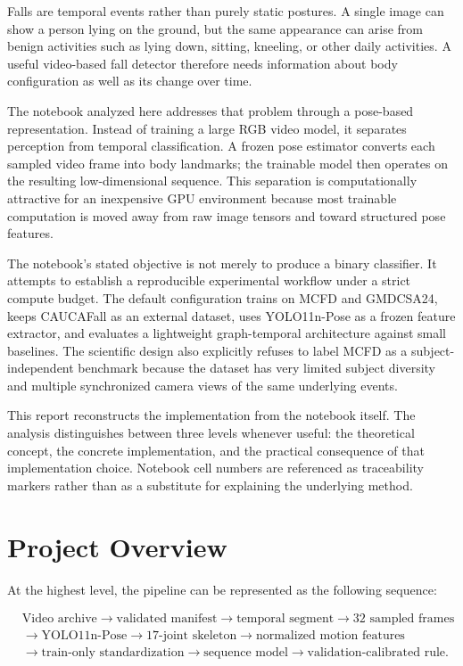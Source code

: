 \documentclass[11pt,a4paper]{article}
\begin{document}
Falls are temporal events rather than purely static postures. A single image can show a person lying on the ground, but the same appearance can arise from benign activities such as lying down, sitting, kneeling, or other daily activities. A useful video-based fall detector therefore needs information about body configuration as well as its change over time.

The notebook analyzed here addresses that problem through a pose-based representation. Instead of training a large RGB video model, it separates perception from temporal classification. A frozen pose estimator converts each sampled video frame into body landmarks; the trainable model then operates on the resulting low-dimensional sequence. This separation is computationally attractive for an inexpensive GPU environment because most trainable computation is moved away from raw image tensors and toward structured pose features.

The notebook's stated objective is not merely to produce a binary classifier. It attempts to establish a reproducible experimental workflow under a strict compute budget. The default configuration trains on MCFD and GMDCSA24, keeps CAUCAFall as an external dataset, uses YOLO11n-Pose as a frozen feature extractor, and evaluates a lightweight graph-temporal architecture against small baselines. The scientific design also explicitly refuses to label MCFD as a subject-independent benchmark because the dataset has very limited subject diversity and multiple synchronized camera views of the same underlying events.

This report reconstructs the implementation from the notebook itself. The analysis distinguishes between three levels whenever useful: the theoretical concept, the concrete implementation, and the practical consequence of that implementation choice. Notebook cell numbers are referenced as traceability markers rather than as a substitute for explaining the underlying method.

\section{Project Overview}

At the highest level, the pipeline can be represented as the following sequence:

\begin{equation}
\begin{aligned}
&\text{Video archive} \rightarrow \text{validated manifest} \rightarrow \text{temporal segment} \rightarrow \text{32 sampled frames} \\[2pt]
&\rightarrow \text{YOLO11n-Pose} \rightarrow \text{17-joint skeleton} \rightarrow \text{normalized motion features} \\[2pt]
&\rightarrow \text{train-only standardization} \rightarrow \text{sequence model} \rightarrow \text{validation-calibrated rule}.
\end{aligned}
\end{equation}
\end{document}
